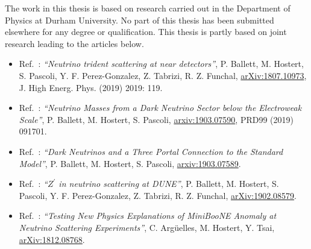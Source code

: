 \documentclass[openany,twoside,frontopenright,chaprunninghead]{ip3thesis}
\begin{document}
\begin{declaration*}
%
	The work in this thesis is based on research carried out in the Department of
	Physics at Durham University. No part of this thesis has been
	submitted elsewhere for any degree or qualification. This thesis is partly based on joint research leading to the articles below.
	\begin{itemize}
	 \item Ref.~\cite{Ballett:2018uuc}: \textit{``Neutrino trident scattering at near detectors''}, P. Ballett, M. Hostert, S. Pascoli, Y. F. Perez-Gonzalez, Z. Tabrizi, R. Z. Funchal, \href{https://arxiv.org/abs/1807.10973}{arXiv:1807.10973}, J. High Energ. Phys. (2019) 2019: 119.
	 \item Ref.~\cite{Ballett:2019cqp}: \textit{``Neutrino Masses from a Dark Neutrino Sector below the Electroweak Scale''}, P. Ballett, M. Hostert, S. Pascoli, \href{https://arxiv.org/abs/1903.07590}{arxiv:1903.07590}, PRD99 (2019) 091701.
	\end{itemize}
	\begin{itemize}
	\item Ref.~\cite{Ballett:2019pyw}: \textit{``Dark Neutrinos and a Three Portal Connection to the Standard Model''}, P. Ballett, M. Hostert, S. Pascoli, \href{https://arxiv.org/abs/1903.07589}{arxiv:1903.07589}.
	\item Ref.~\cite{Ballett:2019xoj}: \textit{``$Z^\prime$ in neutrino scattering at DUNE''}, P. Ballett, M. Hostert, S. Pascoli, Y. F. Perez-Gonzalez, Z. Tabrizi, R. Z. Funchal, \href{https://arxiv.org/abs/1902.08579}{arXiv:1902.08579}.
 	\end{itemize}
	\begin{itemize}
	\item Ref.~\cite{Arguelles:2018mtc}: \textit{``Testing New Physics Explanations of MiniBooNE Anomaly at Neutrino Scattering Experiments''}, C. Arg\"uelles, M. Hostert, Y. Tsai, \href{https://arxiv.org/abs/1812.08768}{arXiv:1812.08768}.
	\end{itemize}
\end{declaration*}
\end{document}
